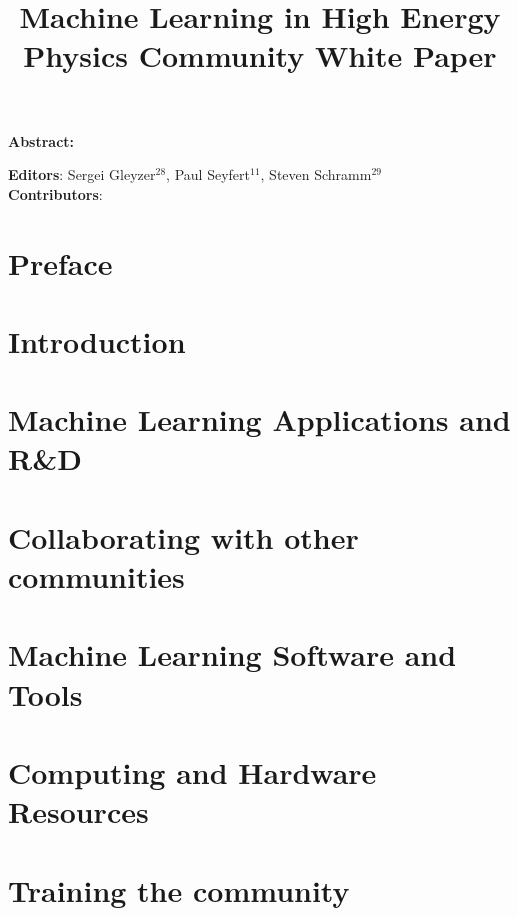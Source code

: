 \documentclass{article}
\begin{document}
\title{Machine Learning in High Energy Physics Community White Paper}

\maketitle

\setlength\parindent{0pt}
\textbf{Abstract:}

\vskip 1cm
\textbf{Editors}: Sergei Gleyzer$^{28}$, Paul Seyfert$^{11}$, Steven Schramm$^{29}$\\
\newline
\textbf{Contributors}:


\tableofcontents
\clearpage

\section{Preface}
\label{sec:preface}


\section{Introduction}
\label{sec:introduction}


\section{Machine Learning Applications and R\&D}
\label{sec:applications}


\section{Collaborating with other communities}
\label{sec:collaboration}


\section{Machine Learning Software and Tools}
\label{sec:software}


\section{Computing and Hardware Resources}
\label{sec:resources}


\section{Training the community}
\label{sec:training}

\end{document}
